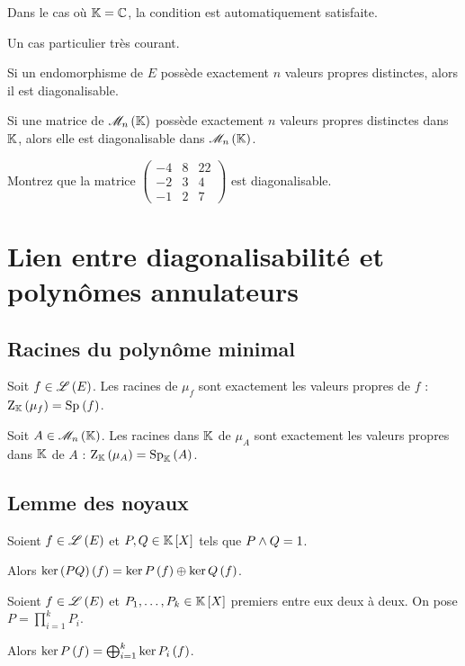 Dans le cas où \(\mathbb{K}=\mathbb{C}\), la condition  est automatiquement satisfaite.

Un cas particulier très courant.

\begin{prop}
Si un endomorphisme de \(E\) possède exactement \(n\) valeurs propres distinctes, alors il est diagonalisable.

Si une matrice de \(\M{n}\) possède exactement \(n\) valeurs propres distinctes dans \(\mathbb{K}\), alors elle est diagonalisable dans \(\M{n}\).
\end{prop}

\begin{exo}
Montrez que la matrice \(\begin{pmatrix}
-4 & 8 & 22 \\
-2 & 3 & 4 \\
-1 & 2 & 7
\end{pmatrix}\) est diagonalisable.
\end{exo}

\section{Lien entre diagonalisabilité et polynômes annulateurs}

\subsection{Racines du polynôme minimal}

\begin{prop}
Soit \(f\in\mathscr{L}\left(E\right)\). Les racines de \(\mu_f\) sont exactement les valeurs propres de \(f\) : \(\rac{\mu_f}=\Sp{f}\).

Soit \(A\in\M{n}\). Les racines dans \(\mathbb{K}\) de \(\mu_A\) sont exactement les valeurs propres dans \(\mathbb{K}\) de \(A\) : \(\rac{\mu_A}=\Sp[\K]{A}\).
\end{prop}

\subsection{Lemme des noyaux}

\begin{prop}
Soient \(f\in\mathscr{L}\left(E\right)\) et \(P,Q\in\poly\) tels que \(P\land Q=1\).

Alors \(\ker\left(PQ\right)\left(f\right)=\ker P\left(f\right)\oplus\ker Q\left(f\right)\).
\end{prop}

\begin{prop}
Soient \(f\in\mathscr{L}\left(E\right)\) et \(P_1,\dots,P_k\in\poly\) premiers entre eux deux à deux. On pose \(P=\prod_{i=1}^kP_i\).

Alors \(\ker P\left(f\right)=\bigoplus_{i=1}^k\ker P_i\left(f\right)\).
\end{prop}

